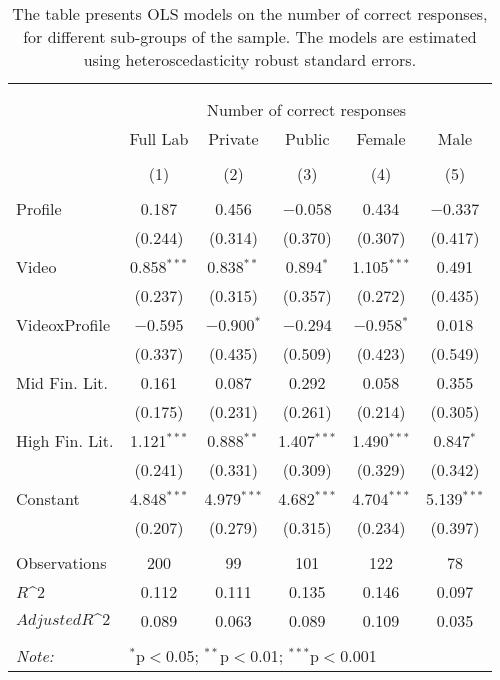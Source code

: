 
\begin{table}[H] \centering 
  \caption{The table presents OLS models on the number of correct responses, for different sub-groups of the sample. The models are estimated
            using heteroscedasticity robust standard errors.} 
  \label{tbl:Main_results_correct_response_lab} 
\begin{tabular}{@{\extracolsep{5pt}}lccccc} 
\\[-1.8ex]\hline 
\hline \\[-1.8ex] 
\\[-1.8ex] & \multicolumn{5}{c}{Number of correct responses} \\ 
 & Full Lab & Private & Public & Female & Male \\ 
\\[-1.8ex] & (1) & (2) & (3) & (4) & (5)\\ 
\hline \\[-1.8ex] 
 Profile & 0.187 & 0.456 & $-$0.058 & 0.434 & $-$0.337 \\ 
  & (0.244) & (0.314) & (0.370) & (0.307) & (0.417) \\ 
  Video & 0.858$^{***}$ & 0.838$^{**}$ & 0.894$^{*}$ & 1.105$^{***}$ & 0.491 \\ 
  & (0.237) & (0.315) & (0.357) & (0.272) & (0.435) \\ 
  VideoxProfile & $-$0.595 & $-$0.900$^{*}$ & $-$0.294 & $-$0.958$^{*}$ & 0.018 \\ 
  & (0.337) & (0.435) & (0.509) & (0.423) & (0.549) \\ 
  Mid Fin. Lit. & 0.161 & 0.087 & 0.292 & 0.058 & 0.355 \\ 
  & (0.175) & (0.231) & (0.261) & (0.214) & (0.305) \\ 
  High Fin. Lit. & 1.121$^{***}$ & 0.888$^{**}$ & 1.407$^{***}$ & 1.490$^{***}$ & 0.847$^{*}$ \\ 
  & (0.241) & (0.331) & (0.309) & (0.329) & (0.342) \\ 
  Constant & 4.848$^{***}$ & 4.979$^{***}$ & 4.682$^{***}$ & 4.704$^{***}$ & 5.139$^{***}$ \\ 
  & (0.207) & (0.279) & (0.315) & (0.234) & (0.397) \\ 
 \hline \\[-1.8ex] 
Observations & 200 & 99 & 101 & 122 & 78 \\ 
$R\^2$ & 0.112 & 0.111 & 0.135 & 0.146 & 0.097 \\ 
$Adjusted R\^2$ & 0.089 & 0.063 & 0.089 & 0.109 & 0.035 \\ 
\hline 
\hline \\[-1.8ex] 
\textit{Note:}  & \multicolumn{5}{l}{$^{*}$p$<$0.05; $^{**}$p$<$0.01; $^{***}$p$<$0.001} \\ 
\end{tabular} 
\end{table} 
